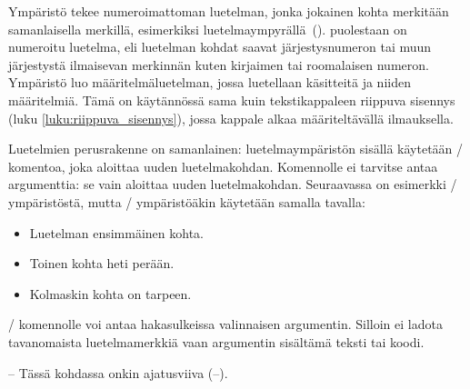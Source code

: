 Ympäristö  tekee numeroimattoman luetelman, jonka
jokainen kohta merkitään samanlaisella merkillä, esimerkiksi
luetelmaympyrällä~(\textbullet).  puolestaan on
numeroitu luetelma, eli luetelman kohdat saavat järjestysnumeron tai
muun järjestystä ilmaisevan merkinnän kuten kirjaimen tai roomalaisen
numeron. Ympäristö  luo määritelmäluetelman,
jossa luetellaan käsitteitä ja niiden määritelmiä. Tämä on käytännössä
sama kuin tekstikappaleen riippuva sisennys (luku
\ref{luku:riippuva_sisennys}), jossa kappale alkaa määriteltävällä
ilmauksella.

Luetelmien perusrakenne on samanlainen: luetelmaympäristön sisällä
käytetään \-/ komentoa, joka aloittaa uuden
luetelmakohdan. Komennolle ei tarvitse antaa argumenttia: se vain
aloittaa uuden luetelmakohdan. Seuraavassa on esimerkki
\-/ ympäristöstä, mutta \-/
ympäristöäkin käytetään samalla tavalla:

\begin{koodilohkosis}
  \begin{itemize}
  \item Luetelman ensimmäinen kohta.
  \item Toinen kohta heti perään.
  \item Kolmaskin kohta on tarpeen.
  \end{itemize}
\end{koodilohkosis}

\-/ komennolle voi antaa hakasulkeissa valinnaisen
argumentin. Silloin ei ladota tavanomaista luetelmamerkkiä vaan
argumentin sisältämä teksti tai koodi.

\begin{koodilohkosis}
  \item[--] Tässä kohdassa onkin ajatusviiva (--).
\end{koodilohkosis}

